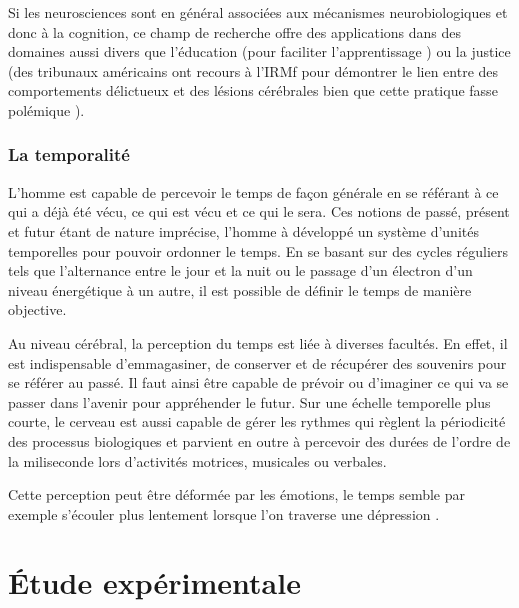 \documentclass[12pt,fleqn,oneside,openany]{book} %
\begin{document}
Si les neurosciences sont en général associées aux mécanismes neurobiologiques et donc à la cognition, ce champ de recherche offre des applications dans des domaines aussi divers que l'éducation (pour faciliter l'apprentissage \cite{pedagogie}) ou la justice (des tribunaux américains ont recours à l'IRMf pour démontrer le lien entre des comportements délictueux et des lésions cérébrales bien que cette pratique fasse polémique \cite{justice}).

\subsection[La temporalité]{La temporalité \cite{reptemps}} \label{ssec:temporalite} %
L'homme est capable de percevoir le temps de façon générale en se référant à ce qui a déjà été vécu, ce qui est vécu et ce qui le sera. Ces notions de passé, présent et futur étant de nature imprécise, l'homme à développé un système d'unités temporelles pour pouvoir ordonner le temps. En se basant sur des cycles réguliers tels que l'alternance entre le jour et la nuit ou le passage d'un électron d'un niveau énergétique à un autre, il est possible de définir le temps de manière objective. 

Au niveau cérébral, la perception du temps est liée à diverses facultés. En effet, il est indispensable d'emmagasiner, de conserver et de récupérer des souvenirs pour se référer au passé. Il faut ainsi être capable de prévoir ou d'imaginer ce qui va se passer dans l'avenir pour appréhender le futur. Sur une échelle temporelle plus courte, le cerveau est aussi capable de gérer les rythmes qui règlent la périodicité des processus biologiques et parvient en outre à percevoir des durées de l'ordre de la miliseconde lors d'activités motrices, musicales ou verbales. \cite{perceptionTemps}

Cette perception peut être déformée par les émotions, le temps semble par exemple s'écouler plus lentement lorsque l'on traverse une dépression \cite{emotiontemps}.



\chapter{\'Etude expérimentale} \label{cha:etudeExp}
\end{document}
